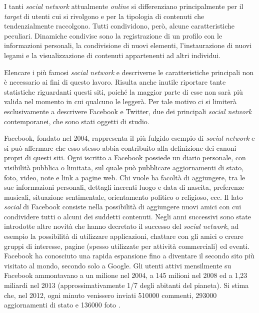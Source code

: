 I tanti \textit{social network} attualmente \textit{online} si differenziano principalmente per il \textit{target} di utenti cui si rivolgono e per la tipologia di contenuti che tendenzialmente raccolgono. 
Tutti condividono, però, alcune caratteristiche peculiari. Dinamiche condivise sono la registrazione di un profilo con le informazioni personali, la condivisione di nuovi elementi, 
l’instaurazione di nuovi legami e la visualizzazione di contenuti appartenenti ad altri individui.

Elencare i più famosi \textit{social network} e descriverne le caratteristiche principali non è necessario ai fini di questo lavoro. Risulta anche inutile riportare tante statistiche 
riguardanti questi siti, poiché la maggior parte di esse non sarà più valida nel momento in cui qualcuno le leggerà. Per tale motivo ci si limiterà esclusivamente a descrivere 
Facebook e Twitter, due dei principali \textit{social network} contemporanei, che sono stati oggetti di studio.

Facebook, fondato nel 2004, rappresenta il più fulgido esempio di \textit{social network} e si può affermare che esso stesso abbia contribuito alla definizione dei canoni propri di questi 
siti. Ogni iscritto a Facebook possiede un diario personale, con visibilità pubblica o limitata, sul quale può pubblicare aggiornamenti di stato, foto, video, note e link a pagine web. 
Chi vuole ha facoltà di aggiungere, tra le sue informazioni personali, dettagli inerenti luogo e data di nascita, preferenze musicali, situazione sentimentale, orientamento politico 
o religioso, ecc. Il lato \textit{social} di Facebook consiste nella possibilità di aggiungere nuovi amici con cui condividere tutti o alcuni dei suddetti contenuti. Negli anni successivi sono 
state introdotte altre novità che hanno decretato il successo del \textit{social network}, ad esempio la possibilità di utilizzare applicazioni, chattare con gli amici o creare gruppi di 
interesse, pagine (spesso utilizzate per attività commerciali) ed eventi. Facebook ha conosciuto una rapida espansione fino a diventare il secondo sito più visitato al mondo, secondo 
solo a Google. Gli utenti attivi mensilmente su Facebook ammontavano a un milione nel 2004, a 145 milioni nel 2008 ed a 1,23 miliardi nel 
2013 \cite{URL:facebookstats} (approssimativamente 1/7 degli abitanti del pianeta). Si stima che, nel 2012, ogni minuto 
venissero inviati 510000 commenti, 293000 aggiornamenti di stato e 136000 foto \cite{URL:mediastats2012}.

